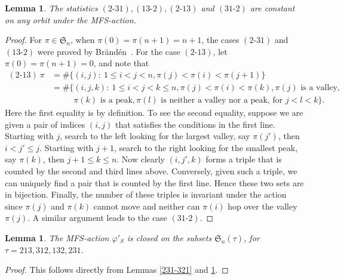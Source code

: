 \documentclass[12pt,reqno]{amsart}
\numberwithin{equation}{section}
\theoremstyle{plain}
\newtheorem{lemma}[theorem]{Lemma}
\theoremstyle{definition}
\def\S{\mathfrak{S}}
\def\cab{31\text{-}2}
\def\bca{2\text{-}31}
\def\acb{13\text{-}2}
\def\bac{2\text{-}13}
\begin{document}
\begin{lemma}\label{13-2:2-13}
The statistics $(\bca), (\acb), (\bac)$ and $(\cab)$ are constant on any orbit under the MFS-action.
\end{lemma}

\begin{proof}
For $\pi\in \S_n$, when $\pi(0)=\pi(n+1)=n+1$, the cases $(\bca)$ and $(\acb)$ were proved by Br\"and\'en~\cite[Theorem 5.1]{Bra08}. For the case $(\bac)$, let $\pi(0)=\pi(n+1)=0$, and note that
\begin{align*}
(\bac)\:\pi &= \#\{(i,j):\: 1\le i<j<n, \pi(j)<\pi(i)<\pi(j+1)\}\\
&=\#\{(i,j,k):\: 1\le i<j<k\le n, \pi(j)<\pi(i)<\pi(k), \pi(j) \text{ is a valley},\\
&\phantom{==}  \pi(k) \text{ is a peak}, \pi(l) \text{ is neither a valley nor a peak, for }j<l<k\}.
\end{align*}
Here the first equality is by definition. To see the second equality, suppose we are given a pair of indices $(i,j)$ that satisfies the conditions in the first line. Starting with $j$, search to the left looking for the largest valley, say $\pi(j')$, then $i<j'\le j$. Starting with $j+1$, search to the right looking for the smallest peak, say $\pi(k)$, then $j+1\le k\le n$. Now clearly $(i,j',k)$ forms a triple that is counted by the second and third lines above. Conversely, given such a triple, we can uniquely find a pair that is counted by the first line. Hence these two sets are in bijection. Finally, the number of these triples is invariant under the action since $\pi(j)$ and $\pi(k)$ cannot move and neither can $\pi(i)$ hop over the valley $\pi(j)$. A similar argument leads to the case $(\cab)$.
\end{proof}

\begin{lemma}\label{Mfspre}
The MFS-action $\varphi'_S$ is closed on the subsets $\S_n(\tau)$, for $\tau=213,312,132,231$.
\end{lemma}
\begin{proof}
This follows directly from Lemmas \ref{231-321} and \ref{13-2:2-13}.
\end{proof}
\end{document}
